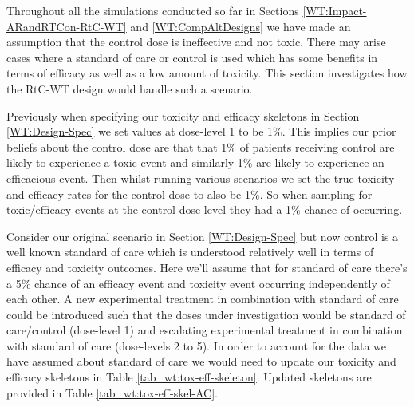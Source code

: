  Throughout all the simulations conducted so far in Sections \ref{WT:Impact-ARandRTCon-RtC-WT} and \ref{WT:CompAltDesigns} we have made an assumption that the control dose is ineffective and not toxic. There may arise cases where a standard of care or control is used which has some benefits in terms of efficacy as well as a low amount of toxicity. This section investigates how the RtC-WT design would handle such a scenario.  
 
 Previously when specifying our toxicity and efficacy skeletons in Section \ref{WT:Design-Spec} we set values at dose-level 1 to be 1\%. This implies our prior beliefs about the control dose are that that 1\% of patients receiving control are likely to experience a toxic event and similarly 1\% are likely to experience an efficacious event. Then whilst running various scenarios we set the true toxicity and efficacy rates for the control dose to also be 1\%. So when sampling for toxic/efficacy events at the control dose-level they had a 1\% chance of occurring.  
 
 Consider our original scenario in Section \ref{WT:Design-Spec} but now control is a well known standard of care which is understood relatively well in terms of efficacy and toxicity outcomes. Here we'll assume that for standard of care there's a 5\% chance of an efficacy event and toxicity event occurring independently of each other. A new experimental treatment in combination with standard of care could be introduced such that the doses under investigation would be standard of care/control (dose-level 1) and escalating experimental treatment in combination with standard of care (dose-levels 2 to 5). In order to account for the data we have assumed about standard of care we would need to update our toxicity and efficacy skeletons in Table \ref{tab_wt:tox-eff-skeleton}. Updated skeletons are provided in Table \ref{tab_wt:tox-eff-skel-AC}.    
 

